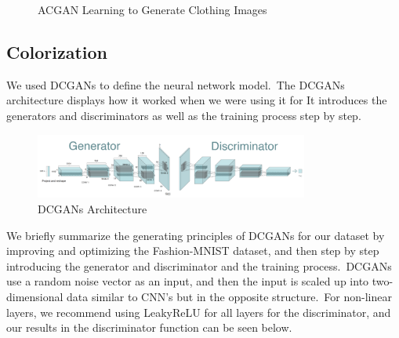 \documentclass[conference]{IEEEtran}
\begin{document}
    \begin{figure}
        \caption{ACGAN Learning to Generate Clothing Images}
        \label{fig:results1}
        \centering
    \end{figure}

    \subsection{Colorization}\label{subsec:results-colorization}

    We used DCGANs to define the neural network model.\ The DCGANs architecture displays how it worked when we were using it for It introduces the generators and discriminators as well as the training process step by step.

    \begin{figure}
        \caption{DCGANs Architecture}
        \label{fig:dcgan-architecture}
        \includegraphics[width=9cm]{architecture.png}
        \centering
    \end{figure}

    We briefly summarize the generating principles of DCGANs for our dataset by improving and optimizing the Fashion-MNIST dataset, and then step by step introducing the generator and discriminator and the training process.\ DCGANs use a random noise vector as an input, and then the input is scaled up into two-dimensional data similar to CNN's but in the opposite structure.\ For non-linear layers, we recommend using LeakyReLU for all layers for the discriminator, and our results in the discriminator function can be seen below.
\end{document}
